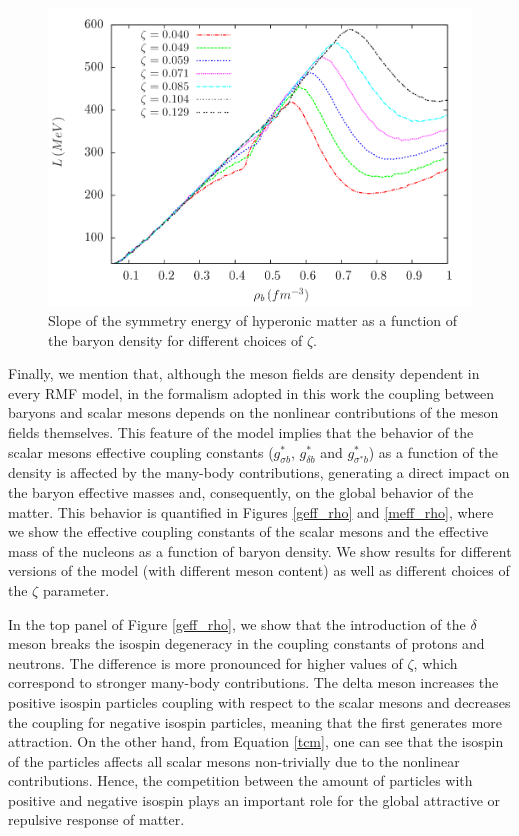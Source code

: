 \documentclass[twocolumn,showpacs,aps]{revtex4}
\begin{document}
  \begin{figure}
 \centering
 \vspace{1.0cm}
 \includegraphics[width=9.cm]{Lrho_paper.png}
 \caption{\label{L_rho} Slope of the symmetry energy of hyperonic matter as a function of the baryon density for different choices of $\zeta$.}
 \end{figure}
 
Finally, we mention that, although the meson fields are density dependent in every RMF model,
in the formalism adopted in this work the coupling between baryons and scalar mesons depends 
on the nonlinear contributions of the meson fields themselves. 
This feature of the model implies that the behavior of the scalar mesons effective coupling constants
($g_{\sigma b}^*$, $g_{\delta b}^*$ and $g_{\sigma^* b}^*$) as a function of the density is affected 
by the many-body contributions, generating a direct impact on the baryon effective masses and,
consequently, on the global behavior of the matter. 
This behavior is quantified in Figures \ref{geff_rho} and \ref{meff_rho}, where we
show the effective coupling constants of the scalar mesons and the effective mass
of the nucleons as a function of baryon density.
We show results for different versions of the model (with different meson content)
as well as different choices of the $\zeta$ parameter.

In the top panel of Figure \ref{geff_rho}, we show that the introduction of the $\delta$ meson
breaks the isospin degeneracy in the coupling constants of protons and neutrons.  
The difference is more pronounced for higher values of $\zeta$, which correspond to
stronger many-body contributions. 
The delta meson increases the positive isospin particles coupling with respect to the 
scalar mesons and decreases the coupling for negative isospin particles, 
meaning that the first generates more attraction. 
On the other hand, from Equation \ref{tcm}, one can see that the isospin of the particles affects
all scalar mesons non-trivially due to the nonlinear contributions.
Hence, the competition between the amount of particles with positive and negative isospin
plays an important role for the global attractive or repulsive response of matter.
\end{document}
